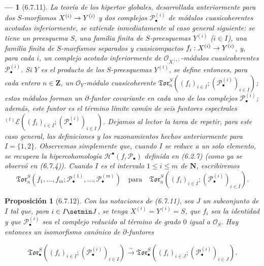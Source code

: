 \documentclass[10pt,oneside,openany]{book}
\theoremstyle{egaenv}\newtheorem*{env}{---}
\theoremstyle{egastatement}
\newtheorem*{proposition}{Proposición}
\theoremstyle{egadescription}
\renewcommand{\leq}{\leqslant}
\renewcommand{\to}{\mathchoice{\longrightarrow}{\rightarrow}{\rightarrow}{\rightarrow}}
\begin{document}
\begin{env}[6.7.11]
\label{III.6.7.11}
La teoría de los hipertor globales, desarrollada anteriormente para dos
$S$-morfismos $X^{(i)}\to Y^{(i)}$ y dos complejos
$\mathscr P_\bullet^{(i)}$ de módulos cuasicoherentes acotados inferiormente,
se extiende inmediatamente al caso general siguiente: se tiene un preesquema
$S$, una familia finita de $S$-preesquemas $Y^{(i)}$ ($i\in I$), una familia
finita de $S$-morfismos \emph{separados} y \emph{cuasicompactos}
$f_i:X^{(i)}\to Y^{(i)}$, y, para cada $i$, un complejo acotado inferiormente
de $\mathscr O_{X^{(i)}}$-módulos cuasicoherentes
$\mathscr P_\bullet^{(i)}$. Si $Y$ es el producto de los $S$-preesquemas
$Y^{(i)}$, se define entonces, para cada entero $n\in\mathbf Z$, un
$\mathscr O_Y$-módulo cuasicoherente
$\mathfrak{Tor}_n^S((f_i)_{i\in I};
(\mathscr P_\bullet^{(i)})_{i\in I})$;
estos módulos forman un $\partial$-funtor covariante en cada uno de los
complejos $\mathscr P_\bullet^{(i)}$; además, este funtor es el término límite
común de seis funtores espectrales
${}^{(t)}\mathscr E((f_i)_{i\in I};(\mathscr P_\bullet^{(i)})_{i\in I})$.
Dejamos al lector la tarea de repetir, para este caso general, las definiciones
y los razonamientos hechos anteriormente para $I=\{1,2\}$. Observemos
simplemente que, cuando $I$ se reduce a un solo elemento, se recupera la
hipercohomología $\mathscr H^\bullet(f,\mathscr P_\bullet)$ definida en
(6.2.7) (como ya se observó en (6.7.4)). Cuando $I$ es el intervalo
$1\leq i\leq m$ de $\mathbf N$, escribiremos
\label{III.6.7.11.2}
\[
  \mathfrak{Tor}_n^S
  (f_1,\ldots,f_m;
   \mathscr P_\bullet^{(1)},\ldots,\mathscr P_\bullet^{(m)})
  \quad\text{para}\quad
  \mathfrak{Tor}_n^S
  ((f_i)_{i\in I};(\mathscr P_\bullet^{(i)})_{i\in I}).
\]
\end{env}

\begin{proposition}[6.7.12]
\label{III.6.7.12}
Con las notaciones de (6.7.11), sea $J$ un subconjunto de $I$ tal que, para
$i\in I\setmin J$, se tenga $X^{(i)}=Y^{(i)}=S$, que $f_i$ sea la identidad y que
$\mathscr P_\bullet^{(i)}$ sea el complejo reducido al término de grado $0$
igual a $\mathscr O_S$. Hay entonces un isomorfismo canónico de
$\partial$-funtores

\label{III.6.7.12.1}
\[
  \mathfrak{Tor}_\bullet^S
  ((f_i)_{i\in I};(\mathscr P_\bullet^{(i)})_{i\in I})
  \xrightarrow{\sim}
  \mathfrak{Tor}_\bullet^S
  ((f_i)_{i\in J};(\mathscr P_\bullet^{(i)})_{i\in J}).
  \tag{6.7.12.1}\label{III.6.7.12.1.fr}
\]

\end{proposition}
\end{document}
